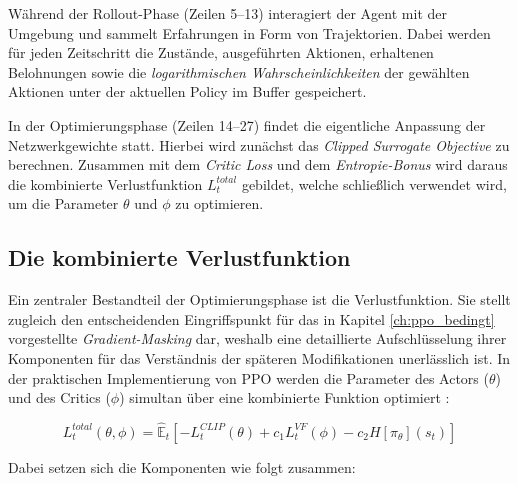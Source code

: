 Während der Rollout\hyp{}Phase (Zeilen 5--13) interagiert der Agent mit der Umgebung und sammelt Erfahrungen in Form von Trajektorien.
Dabei werden für jeden Zeitschritt die Zustände, ausgeführten Aktionen, erhaltenen Belohnungen sowie die \textit{logarithmischen Wahrscheinlichkeiten} der gewählten Aktionen unter der aktuellen Policy im Buffer gespeichert.
\medskip

In der Optimierungsphase (Zeilen 14--27) findet die eigentliche Anpassung der Netzwerkgewichte statt. Hierbei wird zunächst das \textit{Clipped Surrogate Objective} zu berechnen. Zusammen mit dem \textit{Critic Loss} und dem \textit{Entropie\hyp{}Bonus} wird daraus die kombinierte Verlustfunktion $L_t^{total}$ gebildet, welche schließlich verwendet wird, um die Parameter $\theta$ und $\phi$ zu optimieren.

\subsection{Die kombinierte Verlustfunktion}
Ein zentraler Bestandteil der Optimierungsphase ist die Verlustfunktion. Sie stellt zugleich den entscheidenden Eingriffspunkt für das in Kapitel \ref{ch:ppo_bedingt} vorgestellte \textit{Gradient\hyp{}Masking} dar, weshalb eine detaillierte Aufschlüsselung ihrer Komponenten für das Verständnis der späteren Modifikationen unerlässlich ist.
In der praktischen Implementierung von \ac{PPO} werden die Parameter des Actors ($\theta$) und des Critics ($\phi$) simultan über eine kombinierte Funktion optimiert \cite[Glg. 9]{OriginalPPO}:

\begin{equation}
    L_t^{total}(\theta, \phi) = \hat{\mathbb{E}}_t \left[ -L_t^{CLIP}(\theta) + c_1 L_t^{VF}(\phi) - c_2 H[\pi_\theta](s_t) \right]
\end{equation}

Dabei setzen sich die Komponenten wie folgt zusammen:

